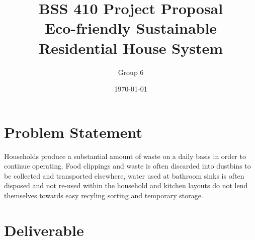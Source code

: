 \documentclass{article}
\begin{document}
\title{\vspace{-5em} BSS 410 Project Proposal\\Eco-friendly Sustainable Residential House System}
\author{Group 6}
\date{\today}
\maketitle

\section{Problem Statement}
Households produce a substantial amount of waste on a daily basis in order to continue operating. Food clippings and waste is often discarded into dustbins to be collected and transported elsewhere, water used at bathroom sinks is often disposed and not re-used within the household and kitchen layouts do not lend themselves towards easy recyling sorting and temporary storage.

\section{Deliverable}
\end{document}
